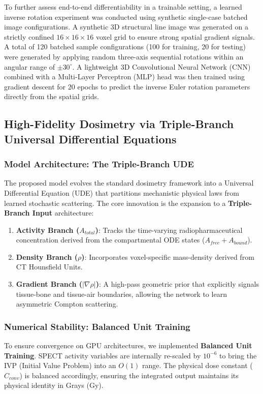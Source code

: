 \documentclass[a4paper,10pt]{elsarticle}
\begin{document}
To further assess end-to-end differentiability in a trainable setting, a learned inverse rotation experiment was conducted using synthetic single-case batched image configurations. A synthetic 3D structural line image was generated on a strictly confined $16 \times 16 \times 16$ voxel grid to ensure strong spatial gradient signals. A total of 120 batched sample configurations (100 for training, 20 for testing) were generated by applying random three-axis sequential rotations within an angular range of $\pm 30^{\circ}$. A lightweight 3D Convolutional Neural Network (CNN) combined with a Multi-Layer Perceptron (MLP) head was then trained using gradient descent for 20 epochs to predict the inverse Euler rotation parameters directly from the spatial grids.



\subsection{High-Fidelity Dosimetry via Triple-Branch Universal Differential Equations}

\subsubsection{Model Architecture: The Triple-Branch UDE}
The proposed model evolves the standard dosimetry framework into a Universal Differential Equation (UDE) that partitions mechanistic physical laws from learned stochastic scattering. The core innovation is the expansion to a \textbf{Triple-Branch Input} architecture:
\begin{enumerate}
    \item \textbf{Activity Branch ($A_{total}$)}: Tracks the time-varying radiopharmaceutical concentration derived from the compartmental ODE states ($A_{free} + A_{bound}$).
    \item \textbf{Density Branch ($\rho$)}: Incorporates voxel-specific mass-density derived from CT Hounsfield Units.
    \item \textbf{Gradient Branch ($|\nabla \rho|$)}: A high-pass geometric prior that explicitly signals tissue-bone and tissue-air boundaries, allowing the network to learn asymmetric Compton scattering.
\end{enumerate}

\subsubsection{Numerical Stability: Balanced Unit Training}
To ensure convergence on GPU architectures, we implemented \textbf{Balanced Unit Training}. SPECT activity variables are internally re-scaled by $10^{-6}$ to bring the IVP (Initial Value Problem) into an $O(1)$ range. The physical dose constant ($C_{conv}$) is balanced accordingly, ensuring the integrated output maintains its physical identity in Grays (Gy).
\end{document}
